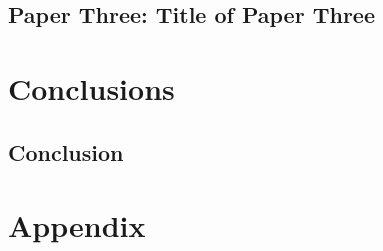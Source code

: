 \documentclass[%
  11pt,               %
  a4paper,            %
  twoside,            %
  openright,          %
  titlepage,          %
  headinclude,        %
  footinclude,        %
  BCOR=5mm,           %
  DIV=calc,           %
  numbers=noenddot    %
]{scrreprt}
\begin{document}




\chapter{Paper Three: Title of Paper Three}
\lipsum[7-8] %

\part{Conclusions}\label{pt:conclusions}
\chapter{Conclusion}
\lipsum[9-10] %


\appendix
\cleardoublepage
\part{Appendix}
\def\dir{chapters/99-A-appendix}


\cleardoublepage
{}
\cleardoublepage
\cleardoublepage
\end{document}
